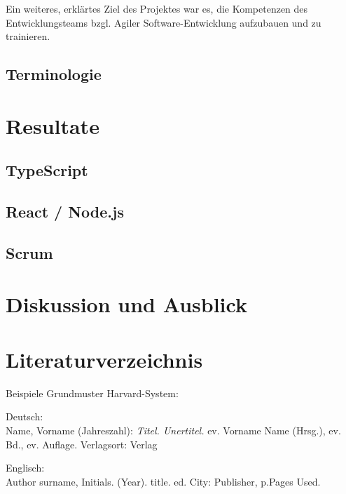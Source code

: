 \documentclass[11pt,a4paper,titlepage]{article}
\begin{document}
Ein weiteres, erklärtes Ziel des Projektes war es, die Kompetenzen des Entwicklungsteams bzgl. Agiler Software-Entwicklung aufzubauen und zu trainieren.

\subsection{Terminologie}



\section{Resultate}

\subsection{TypeScript}

\subsection{React / Node.js}

\subsection{Scrum}

\section{Diskussion und Ausblick}

%

\section{Literaturverzeichnis}
Beispiele Grundmuster Harvard-System:

Deutsch:\\
Name, Vorname (Jahreszahl): \textit{Titel. Unertitel.} ev. Vorname Name (Hrsg.), ev. Bd., ev. Auflage. Verlagsort: Verlag 

Englisch:\\
Author surname, Initials. (Year). title. ed. City: Publisher, p.Pages Used.
\end{document}
